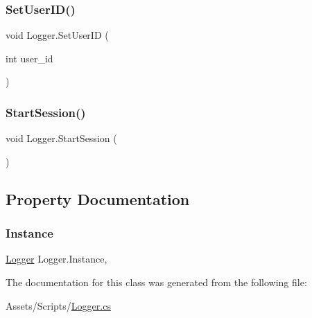 \mbox{\label{classLogger_aaea5a90b12fb6f526f469ea5333b51db}} 
\subsubsection{\texorpdfstring{Set\+User\+I\+D()}{SetUserID()}}
{\footnotesize\ttfamily void Logger.\+Set\+User\+ID (\begin{DoxyParamCaption}\item[{int}]{user\+\_\+id }\end{DoxyParamCaption})\hspace{0.3cm}{\ttfamily [inline]}}

\mbox{\label{classLogger_acd303e3c8e144e2c272756667bb2bb7f}} 
\subsubsection{\texorpdfstring{Start\+Session()}{StartSession()}}
{\footnotesize\ttfamily void Logger.\+Start\+Session (\begin{DoxyParamCaption}{ }\end{DoxyParamCaption})\hspace{0.3cm}{\ttfamily [inline]}}



\subsection{Property Documentation}
\mbox{\label{classLogger_a5ac0e0c61a5b13190e8d3d7113416954}} 
\subsubsection{\texorpdfstring{Instance}{Instance}}
{\footnotesize\ttfamily \hyperlink{classLogger}{Logger} Logger.\+Instance\hspace{0.3cm}{\ttfamily [static]}, {\ttfamily [get]}}



The documentation for this class was generated from the following file\+:\begin{DoxyCompactItemize}
\item 
Assets/\+Scripts/\hyperlink{Logger_8cs}{Logger.\+cs}\end{DoxyCompactItemize}

